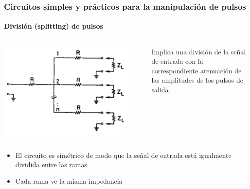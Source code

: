 \documentclass{beamer}
\begin{document}
\begin{frame}
\frametitle{Circuitos simples y prácticos para la manipulación de
pulsos}
\framesubtitle{{\color{blue}División (splitting) de pulsos}}
\begin{columns}
\begin{column}{0.5\textwidth}
\begin{center}
\includegraphics[width=0.9\textwidth]{d2/pulse_splitting}
\end{center}
\end{column}
\begin{column}{0.45\textwidth}
\begin{alertblock}{}
Implica una división de la señal de entrada con la correspondiente 
atenuación de las amplitudes de los pulsos de salida
\end{alertblock}
\end{column}
\end{columns}
\begin{itemize}
\item El circuito es simétrico de modo que la señal de entrada está 
igualmente dividida entre las ramas
\item Cada rama ve la misma impedancia
\end{itemize}
\end{frame}
\end{document}
